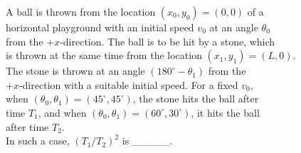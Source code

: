 \documentclass[preview]{standalone}
\begin{document}
\begin{center}
A ball is thrown from the location $(x_0, y_0) = (0, 0)$ of a\\horizontal playground with an initial speed $v_0$ at an angle $\theta_0$\\from the $+x$-direction. The ball is to be hit by a stone, which\\is thrown at the same time from the location $(x_1, y_1) = (L, 0)$.\\[0.3cm]The stone is thrown at an angle $(180^\circ - \theta_1)$ from the\\$+x$-direction with a suitable initial speed. For a fixed $v_0$,\\when $(\theta_0, \theta_1) = (45^\circ, 45^\circ)$, the stone hits the ball after\\time $T_1$, and when $(\theta_0, \theta_1) = (60^\circ, 30^\circ)$, it hits the ball\\after time $T_2$.\\[0.3cm]In such a case, $(T_1 / T_2)^2$ is \_\_\_\_\_.
\end{center}
\end{document}

